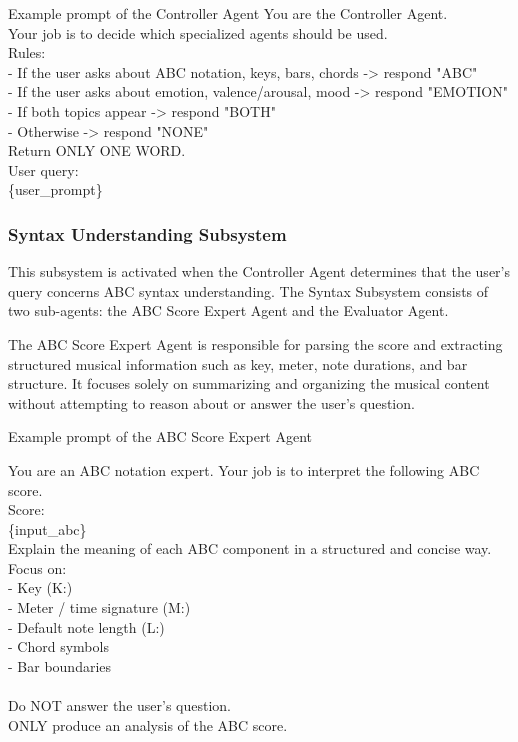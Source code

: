 \documentclass[sigconf]{acmart}
\begin{document}
\begin{promptbox}{Example prompt of the Controller Agent}
You are the Controller Agent.\\

Your job is to decide which specialized agents should be used.\\

Rules:\\
- If the user asks about ABC notation, keys, bars, chords -> respond "ABC"\\
- If the user asks about emotion, valence/arousal, mood -> respond "EMOTION"\\
- If both topics appear -> respond "BOTH"\\
- Otherwise -> respond "NONE"\\

Return ONLY ONE WORD.\\

User query:\\
\{user\_prompt\}\\
\end{promptbox}


\subsubsection{Syntax Understanding Subsystem}
This subsystem is activated when the Controller Agent determines that the user’s query concerns ABC syntax understanding. The Syntax Subsystem consists of two sub-agents: the ABC Score Expert Agent and the Evaluator Agent. 

The ABC Score Expert Agent is responsible for parsing the score and extracting structured musical information such as key, meter, note durations, and bar structure. It focuses solely on summarizing and organizing the musical content without attempting to reason about or answer the user’s question.

\begin{promptbox}{Example prompt of the ABC Score Expert Agent}

You are an ABC notation expert. Your job is to interpret the following ABC score.\\

Score:\\
\{input\_abc\}\\

Explain the meaning of each ABC component in a structured and concise way.\\
Focus on:\\
- Key (K:)\\
- Meter / time signature (M:)\\
- Default note length (L:)\\
- Chord symbols\\
- Bar boundaries\\
\\
Do NOT answer the user's question.\\
ONLY produce an analysis of the ABC score.\\
\end{promptbox}
\end{document}
